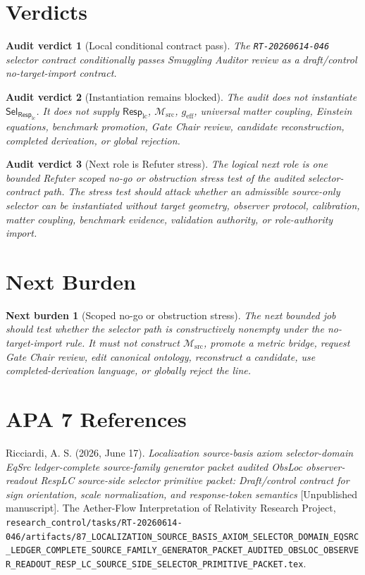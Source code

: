 \documentclass[11pt]{article}
\newcommand{\Msrc}{\mathcal{M}_{\mathrm{src}}}
\newcommand{\RespLC}{\mathsf{Resp}_{\mathrm{lc}}}
\newcommand{\SelResp}{\mathsf{Sel}_{\RespLC}}
\newcommand{\geff}{g_{\mathrm{eff}}}
\newtheorem{verdict}{Audit verdict}
\newtheorem{nextburden}{Next burden}
\begin{document}
\section{Verdicts}

\begin{verdict}[Local conditional contract pass]
The \texttt{RT-20260614-046} selector contract conditionally passes
Smuggling Auditor review as a draft/control no-target-import contract.
\end{verdict}

\begin{verdict}[Instantiation remains blocked]
The audit does not instantiate \(\SelResp\). It does not supply
\(\RespLC\), \(\Msrc\), \(\geff\), universal matter coupling, Einstein
equations, benchmark promotion, Gate Chair review, candidate
reconstruction, completed derivation, or global rejection.
\end{verdict}

\begin{verdict}[Next role is Refuter stress]
The logical next role is one bounded Refuter scoped no-go or
obstruction stress test of the audited selector-contract path. The
stress test should attack whether an admissible source-only selector
can be instantiated without target geometry, observer protocol,
calibration, matter coupling, benchmark evidence, validation
authority, or role-authority import.
\end{verdict}

\section{Next Burden}

\begin{nextburden}[Scoped no-go or obstruction stress]
The next bounded job should test whether the selector path is
constructively nonempty under the no-target-import rule. It must not
construct \(\Msrc\), promote a metric bridge, request Gate Chair
review, edit canonical ontology, reconstruct a candidate, use
completed-derivation language, or globally reject the line.
\end{nextburden}

\section*{APA 7 References}

Ricciardi, A. S. (2026, June 17). \emph{Localization source-basis
axiom selector-domain EqSrc ledger-complete source-family generator
packet audited ObsLoc observer-readout RespLC source-side selector
primitive packet: Draft/control contract for sign orientation, scale
normalization, and response-token semantics} [Unpublished manuscript].
The Aether-Flow Interpretation of Relativity Research Project,
\texttt{research\_control/tasks/RT-20260614-046/artifacts/87\_LOCALIZATION\_SOURCE\_BASIS\_AXIOM\_SELECTOR\_DOMAIN\_EQSRC\_LEDGER\_COMPLETE\_SOURCE\_FAMILY\_GENERATOR\_PACKET\_AUDITED\_OBSLOC\_OBSERVER\_READOUT\_RESP\_LC\_SOURCE\_SIDE\_SELECTOR\_PRIMITIVE\_PACKET.tex}.
\end{document}
